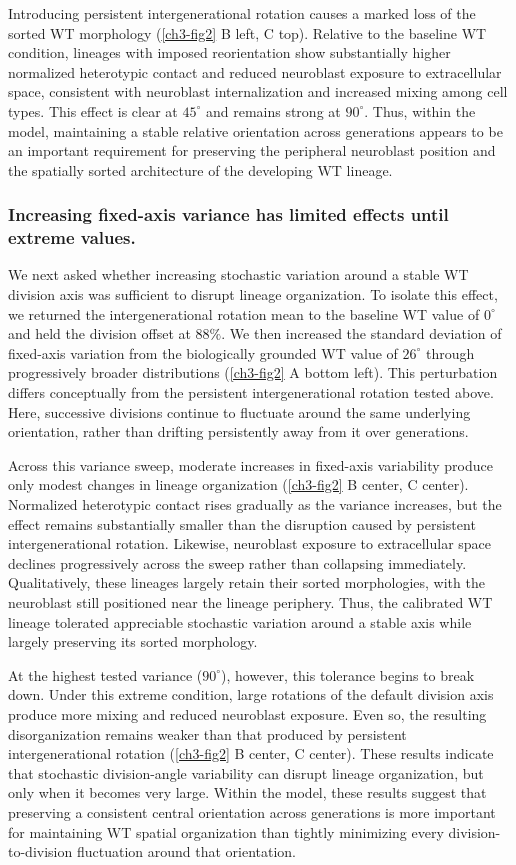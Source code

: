 Introducing persistent intergenerational rotation causes a marked loss of the sorted WT morphology (\ref{ch3-fig2} B left, C top).
Relative to the baseline WT condition, lineages with imposed reorientation show substantially higher normalized heterotypic contact and reduced neuroblast exposure to extracellular space, consistent with neuroblast internalization and increased mixing among cell types.
This effect is clear at $45^\circ$ and remains strong at $90^\circ$.
Thus, within the model, maintaining a stable relative orientation across generations appears to be an important requirement for preserving the peripheral neuroblast position and the spatially sorted architecture of the developing WT lineage.

\subsubsection{Increasing fixed-axis variance has limited effects until extreme values.}
We next asked whether increasing stochastic variation around a stable WT division axis was sufficient to disrupt lineage organization.
To isolate this effect, we returned the intergenerational rotation mean to the baseline WT value of $0^\circ$ and held the division offset at $88\%$.
We then increased the standard deviation of fixed-axis variation from the biologically grounded WT value of $26^\circ$ through progressively broader distributions (\ref{ch3-fig2} A bottom left).
This perturbation differs conceptually from the persistent intergenerational rotation tested above.
Here, successive divisions continue to fluctuate around the same underlying orientation, rather than drifting persistently away from it over generations.

Across this variance sweep, moderate increases in fixed-axis variability produce only modest changes in lineage organization (\ref{ch3-fig2} B center, C center).
Normalized heterotypic contact rises gradually as the variance increases, but the effect remains substantially smaller than the disruption caused by persistent intergenerational rotation.
Likewise, neuroblast exposure to extracellular space declines progressively across the sweep rather than collapsing immediately.
Qualitatively, these lineages largely retain their sorted morphologies, with the neuroblast still positioned near the lineage periphery.
Thus, the calibrated WT lineage tolerated appreciable stochastic variation around a stable axis while largely preserving its sorted morphology.

At the highest tested variance ($90^\circ$), however, this tolerance begins to break down.
Under this extreme condition, large rotations of the default division axis produce more mixing and reduced neuroblast exposure.
Even so, the resulting disorganization remains weaker than that produced by persistent intergenerational rotation (\ref{ch3-fig2} B center, C center).
These results indicate that stochastic division-angle variability can disrupt lineage organization, but only when it becomes very large.
Within the model, these results suggest that preserving a consistent central orientation across generations is more important for maintaining WT spatial organization than tightly minimizing every division-to-division fluctuation around that orientation.

